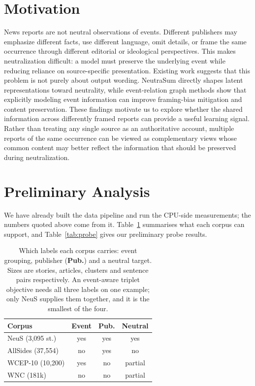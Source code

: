 \documentclass[11pt]{article}
\begin{document}
\section{Motivation}

News reports are not neutral observations of events. Different publishers may
emphasize different facts, use different language, omit details, or frame the
same occurrence through different editorial or ideological perspectives. This
makes neutralization difficult: a model must preserve the underlying event
while reducing reliance on source-specific presentation. Existing work
suggests that this problem is not purely about output wording. NeutraSum
directly shapes latent representations toward neutrality, while event-relation
graph methods show that explicitly modeling event information can improve
framing-bias mitigation and content preservation. These findings motivate us
to explore whether the shared information across differently framed reports
can provide a useful learning signal. Rather than treating any single source
as an authoritative account, multiple reports of the same occurrence can be
viewed as complementary views whose common content may better reflect the
information that should be preserved during neutralization.

\section{Preliminary Analysis}

We have already built the data pipeline and run the CPU-side measurements; the
numbers quoted above come from it. Table~\ref{tab:corpora} summarises what each
corpus can support, and Table~\ref{tab:probe} gives our preliminary probe
results.

\begin{table}[t]
\centering\small
\setlength{\tabcolsep}{4pt}
\begin{tabular}{@{}lccc@{}}
\toprule
\textbf{Corpus} & \textbf{Event} & \textbf{Pub.} & \textbf{Neutral} \\
\midrule
NeuS (3{,}095 st.)    & yes & yes & yes \\
AllSides (37{,}554)   & no  & yes & no  \\
WCEP-10 (10{,}200)    & yes & no  & partial \\
WNC (181k)            & no  & no  & partial \\
\bottomrule
\end{tabular}
\caption{Which labels each corpus carries: event grouping, publisher
(\textbf{Pub.}) and a neutral target. Sizes are stories, articles, clusters and
sentence pairs respectively. An event-aware triplet objective needs all three
labels on one example; only NeuS supplies them together, and it is the smallest
of the four.}
\label{tab:corpora}
\end{table}
\end{document}
